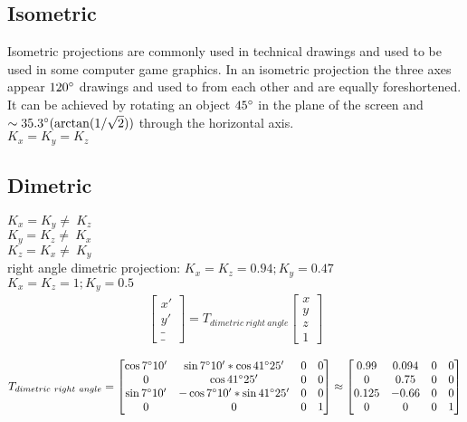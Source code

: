 \documentclass{article}
\begin{document}
\clearpage
\subsection{Isometric}
Isometric projections are commonly used in technical drawings and used to be used in some computer game graphics.
In an isometric projection the three axes appear $120\degree$ drawings and used to from each other and are equally foreshortened.
It can be achieved by rotating an object $45 \degree$ in the plane of the screen and $\sim 35.3 \degree (\arctan (1 / \sqrt 2))$ through the horizontal axis.
\\$K_x = K_y = K_z$
\subsection{Dimetric}
$K_x = K_y \neq~K_z$
\\$K_y = K_z \neq~K_x$
\\$K_z = K_x \neq~K_y$
\\right angle dimetric projection: $K_x = K_z = 0.94; K_y = 0.47$
\\$K_x = K_z = 1; K_y = 0.5$
\\
\begin{gather}
	\begin{bmatrix}
		x'\\
		y'\\
		\_\\
		\_
	\end{bmatrix}
	= T_{dimetric~right~angle}
	\begin{bmatrix}
		x\\
		y\\
		z\\
		1
	\end{bmatrix}
\end{gather}

\begin{gather}
	T_{dimetric~right~angle}
	= 
	\begin{bmatrix}
		\cos 7\degree10' &  \sin  7\degree10' * \cos 41\degree25' & 0 & 0\\
		0                &  \cos 41\degree25'                     & 0 & 0\\
		\sin 7\degree10' & -\cos  7\degree10' * \sin 41\degree25' & 0 & 0\\
		0                & 0                                      & 0 & 1
	\end{bmatrix}
	\approx
	\begin{bmatrix}
		0.99  & 0.094 & 0 & 0\\
		0     & 0.75  & 0 & 0\\
		0.125 & -0.66 & 0 & 0\\
		0     & 0     & 0 & 1
	\end{bmatrix}
\end{gather}
\end{document}
